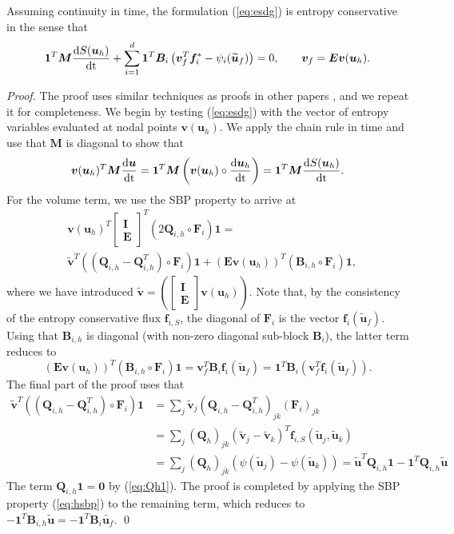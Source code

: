 \documentclass{svjour3}                     %
\renewcommand{\tilde}{\widetilde}
\newcommand{\td}[2]{\frac{{\rm d}#1}{{\rm d}{\rm #2}}}
\newcommand{\LRp}[1]{\left( #1 \right)}
\begin{document}
\begin{theorem}
\label{thm:esdg}
Assuming continuity in time, the formulation (\ref{eq:esdg}) is entropy conservative in the sense that
\[
\bm{1}^T\bm{M}\td{S(\bm{u}_h)}{t} + \sum_{i=1}^d\bm{1}^T\bm{B}_i\LRp{\bm{v}_f^T\bm{f}_i^* - \psi_i(\tilde{\bm{u}}_f)} = 0, \qquad \bm{v}_f =\bm{E}\bm{v}(\bm{u}_h).
\]
\end{theorem}
\begin{proof}
The proof uses similar techniques as proofs in other papers \cite{chen2017entropy, crean2018entropy, chan2017discretely, chan2019skew}, and we repeat it for completeness.  We begin by testing (\ref{eq:esdg}) with the vector of entropy variables evaluated at nodal points $\bm{v}(\bm{u}_h)$.  We apply the chain rule in time and use that $\bm{M}$ is diagonal to show that 
\[
\bm{v}(\bm{u}_h)^T\bm{M}\td{\bm{u}}{t} = \bm{1}^T\bm{M}\LRp{\bm{v}(\bm{u}_h)\circ \td{\bm{u}_h}{t}} =  \bm{1}^T\bm{M}\td{S(\bm{u}_h)}{t}.
\]
For the volume term, we use the SBP property to arrive at
\begin{align*}
&\bm{v}(\bm{u}_h)^T\begin{bmatrix} \bm{I} \\ \bm{E} \end{bmatrix}^T\LRp{2\bm{Q}_{i,h} \circ \bm{F}_i}\bm{1} = \\
&\tilde{\bm{v}}^T\LRp{\LRp{\bm{Q}_{i,h}-\bm{Q}_{i,h}^T} \circ \bm{F}_i}\bm{1}  + \LRp{\bm{E}\bm{v}(\bm{u}_h)}^T\LRp{\bm{B}_{i,h} \circ\bm{F}_i}\bm{1},
\end{align*}
where we have introduced $\tilde{\bm{v}} = \LRp{\begin{bmatrix} \bm{I} \\ \bm{E} \end{bmatrix}\bm{v}(\bm{u}_h)}$.  
Note that, by the consistency of the entropy conservative flux $\bm{f}_{i,S}$, the diagonal of $\bm{F}_i$ is the vector $\bm{f}_i(\tilde{\bm{u}}_f)$.  Using that $\bm{B}_{i,h}$ is diagonal (with non-zero diagonal sub-block $\bm{B}_i$), the latter term reduces to 
\[
\LRp{\bm{E}\bm{v}(\bm{u}_h)}^T\LRp{\bm{B}_{i,h} \circ\bm{F}_i}\bm{1} = \bm{v}_f^T \bm{B}_i\bm{f}_i(\tilde{\bm{u}}_f) =  \bm{1}^T \bm{B}_i\LRp{\bm{v}_f^T\bm{f}_i(\tilde{\bm{u}}_f)}.
\]
The final part of the proof uses that 
\begin{align*}
\tilde{\bm{v}}^T\LRp{\LRp{\bm{Q}_{i,h}-\bm{Q}_{i,h}^T} \circ \bm{F}_i}\bm{1} &= \sum_j {\tilde{\bm{v}}}_j \LRp{\bm{Q}_{i,h}-\bm{Q}_{i,h}^T}_{jk} \LRp{\bm{F}_{i}}_{jk}\\
&= \sum_j \LRp{\bm{Q}_h}_{jk} \LRp{{\tilde{\bm{v}}}_j-{\tilde{\bm{v}}}_k}^T\bm{f}_{i,S}\LRp{\tilde{\bm{u}}_j,\tilde{\bm{u}}_k}\\
&= \sum_j \LRp{\bm{Q}_h}_{jk} \LRp{\psi(\tilde{\bm{u}}_j)-\psi(\tilde{\bm{u}}_k)} = \tilde{\bm{u}}^T\bm{Q}_{i,h}\bm{1}- \bm{1}^T\bm{Q}_{i,h}\tilde{\bm{u}}
\end{align*}
The term $\bm{Q}_{i,h}\bm{1} = \bm{0}$ by (\ref{eq:Qh1}).  The proof is completed by applying the SBP property (\ref{eq:hsbp}) to the remaining term, which reduces to $-\bm{1}^T\bm{B}_{i,h}\tilde{\bm{u}}=-\bm{1}^T\bm{B}_i\tilde{\bm{u}_f}$.
\qed\end{proof}
\end{document}

